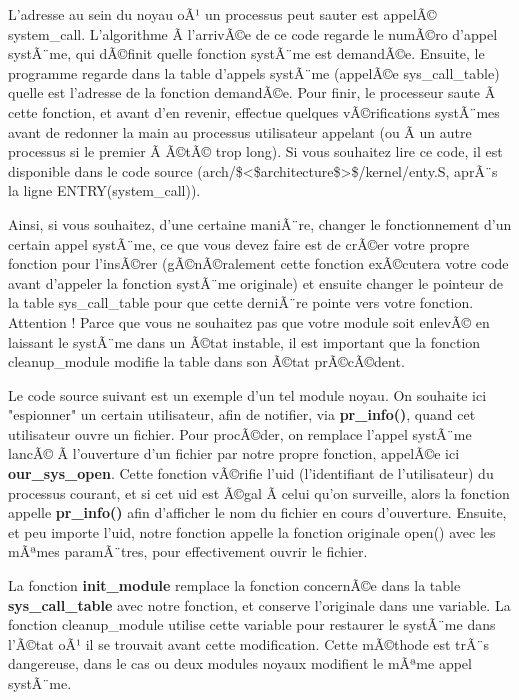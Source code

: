 \documentclass[11pt]{article}
\begin{document}
L'adresse au sein du noyau oÃ¹ un processus peut sauter est appelÃ© system\_call. L'algorithme Ã  l'arrivÃ©e de ce code regarde le numÃ©ro d'appel systÃ¨me, qui dÃ©finit quelle fonction systÃ¨me est demandÃ©e. Ensuite, le programme regarde dans la table d'appels systÃ¨me (appelÃ©e sys\_call\_table) quelle est l'adresse de la fonction demandÃ©e. Pour finir, le processeur saute Ã  cette fonction, et avant d'en revenir, effectue quelques vÃ©rifications systÃ¨mes avant de redonner la main au processus utilisateur appelant (ou Ã  un autre processus si le premier Ã  Ã©tÃ© trop long). Si vous souhaitez lire ce code, il est disponible dans le code source (arch/\$<\$architecture\$>\$/kernel/enty.S, aprÃ¨s la ligne ENTRY(system\_call)).

Ainsi, si vous souhaitez, d'une certaine maniÃ¨re, changer le fonctionnement d'un certain appel systÃ¨me, ce que vous devez faire est de crÃ©er votre propre fonction pour l'insÃ©rer (gÃ©nÃ©ralement cette fonction exÃ©cutera votre code avant d'appeler la fonction systÃ¨me originale) et ensuite changer le pointeur de la table sys\_call\_table pour que cette derniÃ¨re pointe vers votre fonction. Attention ! Parce que vous ne souhaitez pas que votre module soit enlevÃ© en laissant le systÃ¨me dans un Ã©tat instable, il est important que la fonction cleanup\_module modifie la table dans son Ã©tat prÃ©cÃ©dent.

Le code source suivant est un exemple d'un tel module noyau. On souhaite ici "espionner" un certain utilisateur, afin de notifier, via \textbf{pr\_info()}, quand cet utilisateur ouvre un fichier. Pour procÃ©der, on remplace l'appel systÃ¨me lancÃ© Ã  l'ouverture d'un fichier par notre propre fonction, appelÃ©e ici \textbf{our\_sys\_open}. Cette fonction vÃ©rifie l'uid (l'identifiant de l'utilisateur) du processus courant, et si cet uid est Ã©gal Ã  celui qu'on surveille, alors la fonction appelle \textbf{pr\_info()} afin d'afficher le nom du fichier en cours d'ouverture. Ensuite, et peu importe l'uid, notre fonction appelle la fonction originale open() avec les mÃªmes paramÃ¨tres, pour effectivement ouvrir le fichier.

La fonction \textbf{init\_module} remplace la fonction concernÃ©e dans la table \textbf{sys\_call\_table} avec notre fonction, et conserve l'originale dans une variable. La fonction cleanup\_module utilise cette variable pour restaurer le systÃ¨me dans l'Ã©tat oÃ¹ il se trouvait avant cette modification. Cette mÃ©thode est trÃ¨s dangereuse, dans le cas ou deux modules noyaux modifient le mÃªme appel systÃ¨me.
\end{document}
